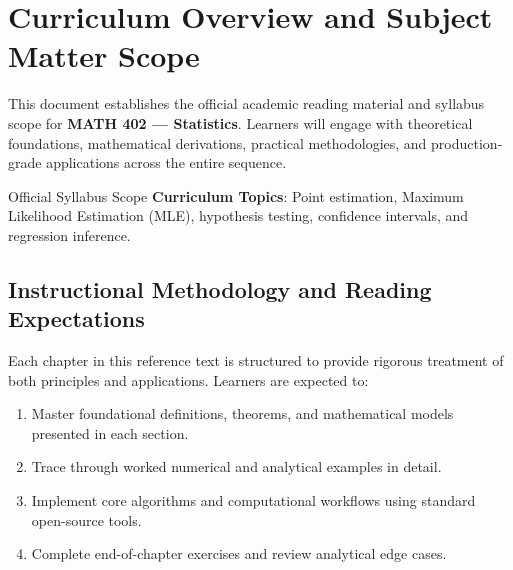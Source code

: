 \section{Curriculum Overview and Subject Matter Scope}

This document establishes the official academic reading material and syllabus scope for \textbf{MATH 402 --- Statistics}. Learners will engage with theoretical foundations, mathematical derivations, practical methodologies, and production-grade applications across the entire sequence.

\begin{InsightBox}{Official Syllabus Scope}
  \textbf{Curriculum Topics}: Point estimation, Maximum Likelihood Estimation (MLE), hypothesis testing, confidence intervals, and regression inference.
\end{InsightBox}

\subsection{Instructional Methodology and Reading Expectations}

Each chapter in this reference text is structured to provide rigorous treatment of both principles and applications. Learners are expected to:
\begin{enumerate}
  \item Master foundational definitions, theorems, and mathematical models presented in each section.
  \item Trace through worked numerical and analytical examples in detail.
  \item Implement core algorithms and computational workflows using standard open-source tools.
  \item Complete end-of-chapter exercises and review analytical edge cases.
\end{enumerate}

